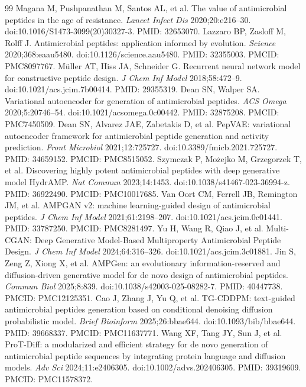 \documentclass[unnumsec,webpdf,contemporary,large]{oup-authoring-template}
\begin{document}
\begin{thebibliography}{99}
 Magana M, Pushpanathan M, Santos AL, et al. The value of antimicrobial peptides in the age of resistance. \textit{Lancet Infect Dis} 2020;20:e216--30. doi:10.1016/S1473-3099(20)30327-3. PMID: 32653070.
 Lazzaro BP, Zasloff M, Rolff J. Antimicrobial peptides: application informed by evolution. \textit{Science} 2020;368:eaau5480. doi:10.1126/science.aau5480. PMID: 32355003. PMCID: PMC8097767.
 Müller AT, Hiss JA, Schneider G. Recurrent neural network model for constructive peptide design. \textit{J Chem Inf Model} 2018;58:472--9. doi:10.1021/acs.jcim.7b00414. PMID: 29355319.
 Dean SN, Walper SA. Variational autoencoder for generation of antimicrobial peptides. \textit{ACS Omega} 2020;5:20746--54. doi:10.1021/acsomega.0c00442. PMID: 32875208. PMCID: PMC7450509.
 Dean SN, Alvarez JAE, Zabetakis D, et al. PepVAE: variational autoencoder framework for antimicrobial peptide generation and activity prediction. \textit{Front Microbiol} 2021;12:725727. doi:10.3389/fmicb.2021.725727. PMID: 34659152. PMCID: PMC8515052.
 Szymczak P, Możejko M, Grzegorzek T, et al. Discovering highly potent antimicrobial peptides with deep generative model HydrAMP. \textit{Nat Commun} 2023;14:1453. doi:10.1038/s41467-023-36994-z. PMID: 36922490. PMCID: PMC10017685.
 Van Oort CM, Ferrell JB, Remington JM, et al. AMPGAN v2: machine learning-guided design of antimicrobial peptides. \textit{J Chem Inf Model} 2021;61:2198--207. doi:10.1021/acs.jcim.0c01441. PMID: 33787250. PMCID: PMC8281497.
 Yu H, Wang R, Qiao J, et al. Multi-CGAN: Deep Generative Model-Based Multiproperty Antimicrobial Peptide Design. \textit{J Chem Inf Model} 2024;64:316--326. doi:10.1021/acs.jcim.3c01881.
 Jin S, Zeng Z, Xiong X, et al. AMPGen: an evolutionary information-reserved and diffusion-driven generative model for de novo design of antimicrobial peptides. \textit{Commun Biol} 2025;8:839. doi:10.1038/s42003-025-08282-7. PMID: 40447738. PMCID: PMC12125351.
 Cao J, Zhang J, Yu Q, et al. TG-CDDPM: text-guided antimicrobial peptides generation based on conditional denoising diffusion probabilistic model. \textit{Brief Bioinform} 2025;26:bbae644. doi:10.1093/bib/bbae644. PMID: 39668337. PMCID: PMC11637771.
 Wang XF, Tang JY, Sun J, et al. ProT-Diff: a modularized and efficient strategy for de novo generation of antimicrobial peptide sequences by integrating protein language and diffusion models. \textit{Adv Sci} 2024;11:e2406305. doi:10.1002/advs.202406305. PMID: 39319609. PMCID: PMC11578372.

\end{thebibliography}
\end{document}
